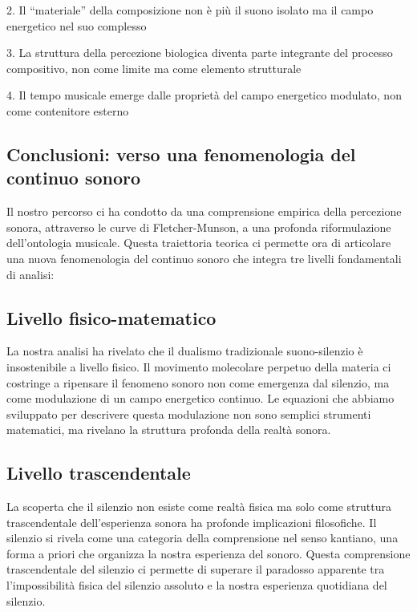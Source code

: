 \documentclass{gs-adonis}
\begin{document}
2. Il ``materiale'' della composizione non è più il suono isolato ma il
campo energetico nel suo complesso

3. La struttura della percezione biologica diventa parte integrante del
processo compositivo, non come limite ma come elemento strutturale

4. Il tempo musicale emerge dalle proprietà del campo energetico
modulato, non come contenitore esterno

\subsection{Conclusioni: verso una fenomenologia del continuo
sonoro}\label{conclusioni-verso-una-fenomenologia-del-continuo-sonoro}

Il nostro percorso ci ha condotto da una comprensione empirica della
percezione sonora, attraverso le curve di Fletcher-Munson, a una
profonda riformulazione dell'ontologia musicale. Questa traiettoria
teorica ci permette ora di articolare una nuova fenomenologia del
continuo sonoro che integra tre livelli fondamentali di analisi:

\subsection{Livello fisico-matematico}\label{livello-fisico-matematico}

La nostra analisi ha rivelato che il dualismo tradizionale
suono-silenzio è insostenibile a livello fisico. Il movimento molecolare
perpetuo della materia ci costringe a ripensare il fenomeno sonoro non
come emergenza dal silenzio, ma come modulazione di un campo energetico
continuo. Le equazioni che abbiamo sviluppato per descrivere questa
modulazione non sono semplici strumenti matematici, ma rivelano la
struttura profonda della realtà sonora.

\subsection{Livello trascendentale}\label{livello-trascendentale}

La scoperta che il silenzio non esiste come realtà fisica ma solo come
struttura trascendentale dell'esperienza sonora ha profonde implicazioni
filosofiche. Il silenzio si rivela come una categoria della comprensione
nel senso kantiano, una forma a priori che organizza la nostra
esperienza del sonoro. Questa comprensione trascendentale del silenzio
ci permette di superare il paradosso apparente tra l'impossibilità
fisica del silenzio assoluto e la nostra esperienza quotidiana del
silenzio.
\end{document}
